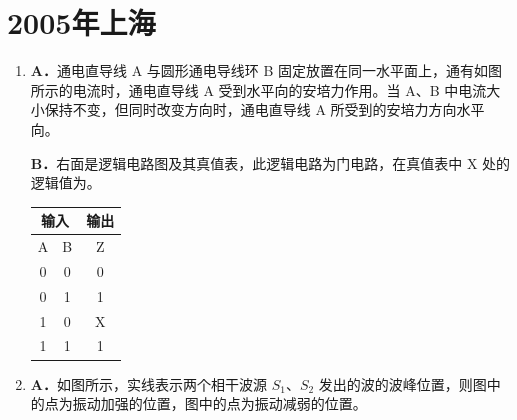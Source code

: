 \documentclass[\gkver]{gaokaozhenti}
\begin{document}
\chapter{2005年上海}

\begin{enumerate}
\item
\textbf{A．}通电直导线 A 与圆形通电导线环 B 固定放置在同一水平面上，通有如图所示的电流时，通电直导线 A 受到水平向的安培力作用。当 A、B 中电流大小保持不变，但同时改变方向时，通电直导线 A 所受到的安培力方向水平向。


\textbf{B．}右面是逻辑电路图及其真值表，此逻辑电路为门电路，在真值表中 X 处的逻辑值为。

\begin{center}
\begin{tabular}{|c|c|c|}
\hline
\multicolumn{2}{|c|}{输入} & 输出 \\ \hline
A & B & Z \\ \hline
0 & 0 & 0 \\ \hline
0 & 1 & 1 \\ \hline
1 & 0 & X \\ \hline
1 & 1 & 1 \\ \hline
\end{tabular}
\end{center}

\onepicture[align=right, w=2.49cm]{}


\item
\textbf{A．}如图所示，实线表示两个相干波源 $S_{1}$、$S_{2}$ 发出的波的波峰位置，则图中的点为振动加强的位置，图中的点为振动减弱的位置。


\end{enumerate}
\end{document}
